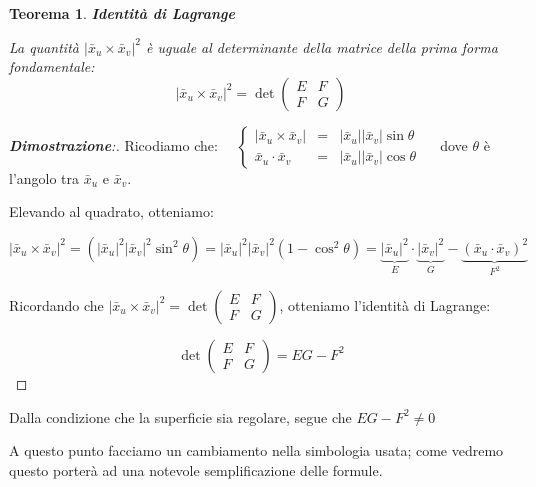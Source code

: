 \newtheorem{theorem}{Teorema}[chapter]
\begin{theorem}

    \textbf{Identità di Lagrange}

    La quantità $|\bar x_u \times \bar x_v|^2$ è uguale al determinante della matrice della prima forma fondamentale:
    $$
    |\bar x_u \times \bar x_v|^2 =
    \det
    \begin{pmatrix}
        E & F \\
        F & G
    \end{pmatrix}
    $$
\end{theorem}
\begin{proof}[\textbf{Dimostrazione}:]
    \phantom{}

    Ricodiamo che: $
    \quad
    \left\{
    \begin{array}{ccl}
    |\bar x_u \times \bar x_v| & = & |\bar x_u| |\bar x_v| \sin \theta
    \\
    \bar x_u \cdot \bar x_v & = & |\bar x_u| |\bar x_v| \cos \theta
    \end{array}
    \right.
    \quad
    $
    dove $\theta$ è l'angolo tra $\bar x_u$ e $\bar x_v$.
    
    Elevando al quadrato, otteniamo:

    $$
    |\bar x_u \times \bar x_v|^2 = (|\bar x_u|^2 |\bar x_v|^2 \sin^2 \theta) = |\bar x_u|^2 |\bar x_v|^2 (1 - \cos^2 \theta) = \underbrace{|\bar x_u|^2}_E \cdot \underbrace{|\bar x_v|^2}_G - \underbrace{(\bar x_u \cdot \bar x_v)^2}_{F^2}
    $$

    
    Ricordando che $|\bar x_u \times \bar x_v|^2 = \det \begin{pmatrix} E & F \\ F & G \end{pmatrix}$, otteniamo l'identità di Lagrange:
    
    $$
    \det \begin{pmatrix} E & F \\ F & G \end{pmatrix} = EG - F^2
    $$ 
\end{proof}

Dalla condizione che la superficie sia regolare, segue che $E G - F^2 \neq 0$

\vspace{1em}

A questo punto facciamo un cambiamento nella simbologia usata; come vedremo questo porterà ad una notevole semplificazione delle formule.

